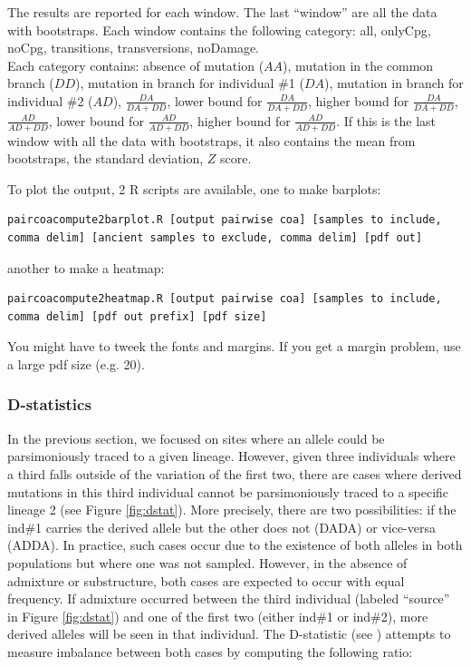 \documentclass[a4paper]{article}
\begin{document}

The results are reported for each window. The last ``window'' are all the data with bootstraps. Each window contains the following category: all, onlyCpg, noCpg, transitions, transversions, noDamage.\\

Each category contains: absence of mutation ($AA$), mutation in the common branch ($DD$), mutation in branch for individual \#1 ($DA$), mutation in branch for individual \#2 ($AD$), $\frac { DA} { DA+DD }$, lower bound for $\frac { DA} { DA+DD }$, higher bound for $\frac { DA} { DA+DD }$, $\frac { AD} { AD+DD }$, lower bound for $\frac { AD} { AD+DD }$, higher bound for $\frac { AD} { AD+DD }$. If this is the last window with all the data with bootstraps, it also contains the mean from bootstraps, the standard deviation, $Z$ score.


To plot the output, 2 R scripts are available, one to make barplots:

\begin{lstlisting}
paircoacompute2barplot.R [output pairwise coa] [samples to include, comma delim] [ancient samples to exclude, comma delim] [pdf out]
\end{lstlisting}

another to make a heatmap:
\begin{lstlisting}
paircoacompute2heatmap.R [output pairwise coa] [samples to include, comma delim] [pdf out prefix] [pdf size]
\end{lstlisting}

You might have to tweek the fonts and margins. If you get a margin problem, use a large pdf size (e.g. 20).


\subsubsection{D-statistics}


In the previous section, we focused on sites where an allele could be parsimoniously traced to a given lineage. However, given three individuals where a third falls outside of the variation of the first two, there are cases where derived mutations in this third individual cannot be parsimoniously traced to a specific lineage 2 (see Figure \ref{fig:dstat}). More precisely, there are two possibilities: if the ind\#1 carries the derived allele but the other does not (DADA) or vice-versa (ADDA). In practice, such cases occur due to the existence of both alleles in both populations but where one was not sampled. However, in the absence of admixture or substructure, both cases are expected to occur with equal frequency. If admixture occurred between the third individual (labeled ``source'' in Figure \ref{fig:dstat}) and one of the first two (either ind\#1 or ind\#2), more derived alleles will be seen in that individual. The D-statistic (see \cite{patterson2012ancient}) attempts to measure imbalance between both cases by computing the following ratio:
\end{document}
